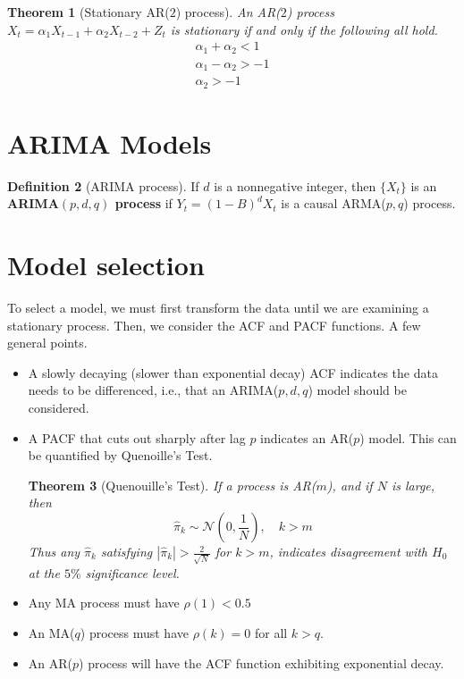 \documentclass[10pt, oneside, reqno]{amsart}
\theoremstyle{plain}%
\newtheorem{thm}{Theorem}[section]
\theoremstyle{definition}
\newtheorem{defn}[thm]{Definition}
\theoremstyle{remark}
\begin{document}
\begin{thm}[Stationary AR($2$) process]
    An AR($2$) process $X_t = \alpha_1 X_{t-1} + \alpha_2 X_{t-2} + Z_t$ is stationary if and only if the following all hold.
    \begin{align*}
        \alpha_1 + \alpha_2 < 1 \\
        \alpha_1 - \alpha_2 > -1 \\
        \alpha_2 > -1
    \end{align*}
\end{thm}


\section{ARIMA Models} %
\label{sec:arima_models}

\begin{defn}[ARIMA process]
    If $d$ is a nonnegative integer, then $\{X_t\}$ is an \textbf{ARIMA$(p,d,q)$ process} if $Y_t = (1-B)^d X_t$ is a causal ARMA($p,q$) process.
\end{defn}


\section{Model selection} %
\label{sec:model_selection}
    To select a model, we must first transform the data until we are examining a stationary process. 
    Then, we consider the ACF and PACF functions.  A few general points.
    \begin{itemize}
        \item A slowly decaying (slower than exponential decay) ACF indicates the data needs to be differenced, i.e., that an ARIMA($p,d,q$) model should be considered.
        \item A PACF that cuts out sharply after lag $p$ indicates an AR($p$) model.  This can be quantified by Quenoille's Test.  \begin{thm}[Quenouille's Test]
            If a process is AR($m$), and if $N$ is large, then \[
                \hat \pi_k \sim \mathcal{N}(0, \frac{1}{N}), \quad k > m
            \]
        Thus any $\hat \pi_k$ satisfying $|\hat \pi_k| > \frac{2}{\sqrt{N}}$ for $k > m$, indicates disagreement with $H_0$ at the $5\%$ significance level.
        \end{thm}
        \item Any MA process must have $\rho(1) < 0.5$
        \item An MA($q$) process must have $\rho(k) = 0$ for all $k > q$.
        \item An AR($p$) process will have the ACF function exhibiting exponential decay.
        \end{itemize}
\end{document}
